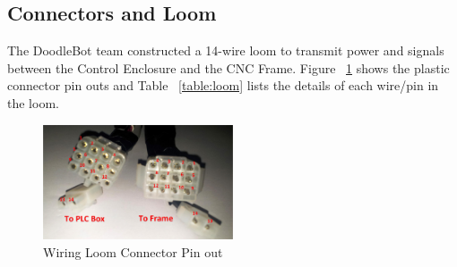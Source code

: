 	\subsection{Connectors and Loom}
	
	The DoodleBot team constructed a 14-wire loom to transmit power and signals between the Control Enclosure and the CNC Frame. Figure ~\ref{fig:loom} shows the plastic connector pin outs and Table ~\ref{table:loom} lists the details of each wire/pin in the loom.
		\begin{figure}[h]
			\centering
			\includegraphics[width=0.5\textwidth]{figures/cncmachine/loom.jpg}
			\caption{Wiring Loom Connector Pin out}
			\label{fig:loom}
		\end{figure}
		
